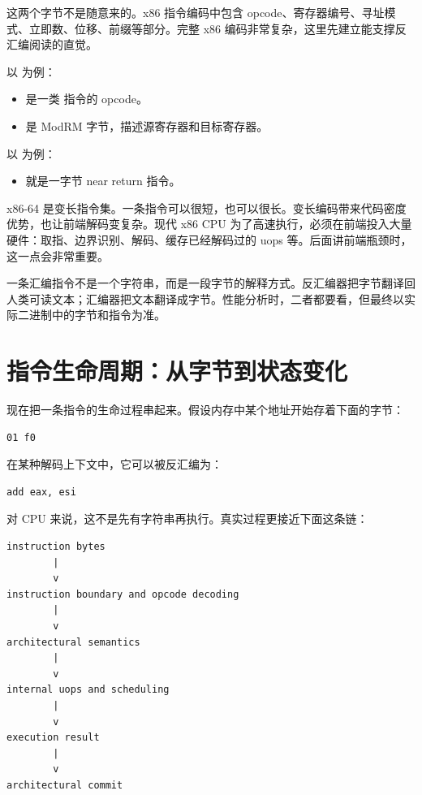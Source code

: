 这两个字节不是随意来的。x86 指令编码中包含 opcode、寄存器编号、寻址模式、立即数、位移、前缀等部分。完整 x86 编码非常复杂，这里先建立能支撑反汇编阅读的直觉。

以  为例：

\begin{itemize}
  \item {} 是一类  指令的 opcode。
  \item {} 是 ModRM 字节，描述源寄存器和目标寄存器。
\end{itemize}

以  为例：

\begin{itemize}
  \item {} 就是一字节 near return 指令。
\end{itemize}

x86-64 是变长指令集。一条指令可以很短，也可以很长。变长编码带来代码密度优势，也让前端解码变复杂。现代 x86 CPU 为了高速执行，必须在前端投入大量硬件：取指、边界识别、解码、缓存已经解码过的 uops 等。后面讲前端瓶颈时，这一点会非常重要。

\begin{mentalmodel}
一条汇编指令不是一个字符串，而是一段字节的解释方式。反汇编器把字节翻译回人类可读文本；汇编器把文本翻译成字节。性能分析时，二者都要看，但最终以实际二进制中的字节和指令为准。
\end{mentalmodel}

\section{指令生命周期：从字节到状态变化}

现在把一条指令的生命过程串起来。假设内存中某个地址开始存着下面的字节：

\begin{lstlisting}
01 f0
\end{lstlisting}

在某种解码上下文中，它可以被反汇编为：

\begin{lstlisting}
add eax, esi
\end{lstlisting}

对 CPU 来说，这不是先有字符串再执行。真实过程更接近下面这条链：

\begin{center}
\begin{minipage}{0.86\linewidth}
\begin{verbatim}
instruction bytes
        |
        v
instruction boundary and opcode decoding
        |
        v
architectural semantics
        |
        v
internal uops and scheduling
        |
        v
execution result
        |
        v
architectural commit
\end{verbatim}
\end{minipage}
\end{center}

